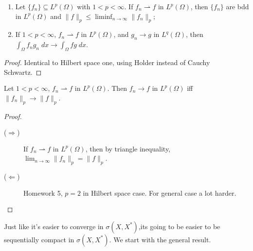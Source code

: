 \begin{prop}
    \begin{enumerate}
        \item Let $\{f_n\} \subseteq L^p(\Omega)$ with $1 < p < \infty$. If $f_n \rightharpoonup f$
        in $L^p(\Omega)$, then $\{f_n\}$ are bdd in $L^p(\Omega)$ and $\| f \|_p \leq \liminf_{n \to \infty} \| f_n \|_p$;
        \item If $1 < p < \infty$, $f_n \rightharpoonup f$ in $L^p(\Omega)$, and $g_n \to g$ in $L^q(\Omega)$, 
        then $\int_{\Omega} f_n g_n \; dx \to \int_{\Omega} f g \; dx$.    
    \end{enumerate}
\end{prop}

\begin{proof}
    Identical to Hilbert space one, using Holder instead of Cauchy Schwartz.
\end{proof}

\begin{thm}
    Let $1 < p < \infty$, $f_n \rightharpoonup f$ in $L^p(\Omega)$. Then $f_n \to f$ in $L^p(\Omega)$
    iff $\| f_n \|_p \to \| f \|_p$.      
\end{thm}
\begin{proof}
    \leavevmode
    \begin{description}
        \item [($\Rightarrow$)] If $f_n \rightharpoonup f$ in $L^p(\Omega)$, then by triangle inequality, $\lim_{n \to \infty} \| f_n \|_p = \| f \|_p$.
        \item [($\Leftarrow$)] Homework 5, $p = 2$ in Hilbert space case. For general case
        a lot harder. \qedhere  
    \end{description}
\end{proof}

Just like it's easier to converge in $\sigma(X, X^*)$,its going to be easier to 
be sequentially compact in $\sigma(X, X^*)$. We start with the general result.

